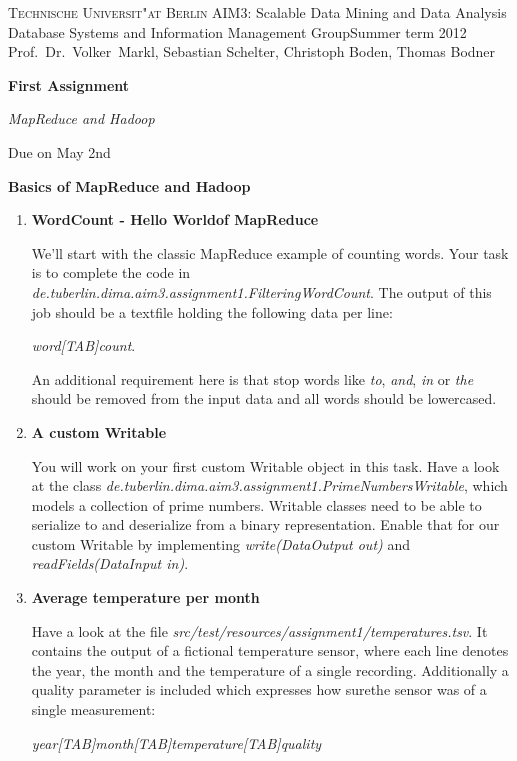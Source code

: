 \documentclass[11pt,a4paper]{article}
\begin{document}
\textsc{Technische Universit"at Berlin}{\small\hfill 
AIM3: Scalable Data Mining and Data Analysis}\\
{\small Database Systems and Information Management Group{\small\hfill Summer term 2012}\\
Prof.~Dr.~Volker~Markl, Sebastian Schelter, Christoph Boden, Thomas Bodner}

\bigskip
\centerline{\Large\textbf{First Assignment}}
\centerline{\emph{MapReduce and Hadoop}}
\centerline{Due on May 2nd}
\bigskip

\centerline{\textbf{Basics of MapReduce and Hadoop}}
\bigskip

\begin{enumerate}
\item \textbf{WordCount - \dq{}Hello World\dq of MapReduce}

We'll start with the classic MapReduce example of counting words. Your task is to complete the code in \textit{de.tuberlin.dima.aim3.assignment1.FilteringWordCount}.
The output of this job should be a textfile holding the following data per line:

\textit{word[TAB]count}.

An additional requirement here is that stop words like \textit{to}, \textit{and}, \textit{in} or \textit{the} should be removed from the input data and all words should be lowercased.

\item \textbf{A custom Writable}

You will work on your first custom Writable object in this task. Have a look at the class \textit{de.tuberlin.dima.aim3.assignment1.PrimeNumbersWritable}, which models a collection of prime numbers. Writable classes need to be able to serialize to and deserialize from a binary representation.
Enable that for our custom Writable by implementing \textit{write(DataOutput out)} and \textit{readFields(DataInput in)}.

\item \textbf{Average temperature per month}

Have a look at the file \textit{src/test/resources/assignment1/temperatures.tsv}. It contains the output of a fictional temperature sensor, where each line denotes the year, the month and the temperature of a single recording. Additionally a quality parameter is included which expresses how \dq{}sure\dq the sensor was of a single measurement:

\textit{year[TAB]month[TAB]temperature[TAB]quality}


\end{enumerate}
\end{document}
